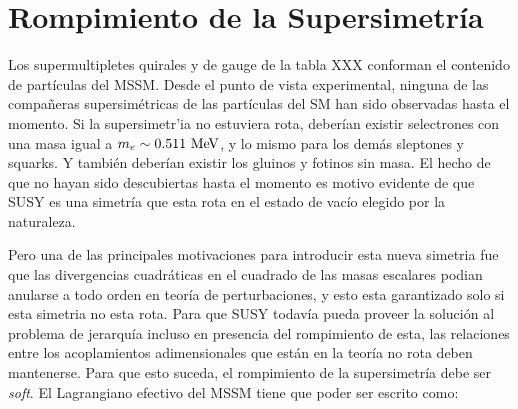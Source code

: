 







\section{Rompimiento de la Supersimetría}

Los supermultipletes quirales y de gauge de la tabla XXX conforman el contenido
de partículas del MSSM. Desde el punto de vista experimental, ninguna de las
compa\~neras supersimétricas de las partículas del SM han sido observadas hasta
el momento.
Si la supersimetr'ia no estuviera rota, deberían existir selectrones con una masa igual
a $m_e \sim 0.511 \mev$, y lo mismo para los demás sleptones y squarks. Y también
deberían existir los gluinos y fotinos sin masa.
El hecho de que no hayan sido descubiertas hasta el momento es motivo evidente
de que SUSY es una simetría que esta rota en el estado de vacío elegido
por la naturaleza.

Pero una de las principales motivaciones para introducir esta nueva simetria
fue que las divergencias cuadráticas en el cuadrado de las masas escalares
podian anularse a todo orden en teoría de perturbaciones, y esto esta garantizado
solo si esta simetria no esta rota.
Para que SUSY todavía pueda proveer la solución al problema de jerarquía incluso
en presencia del rompimiento de esta, las relaciones entre los acoplamientos
adimensionales que están en la teoría no rota deben mantenerse.
Para que esto suceda, el rompimiento de la supersimetría debe ser \emph{soft}.
El Lagrangiano efectivo del MSSM tiene que poder ser escrito como:

